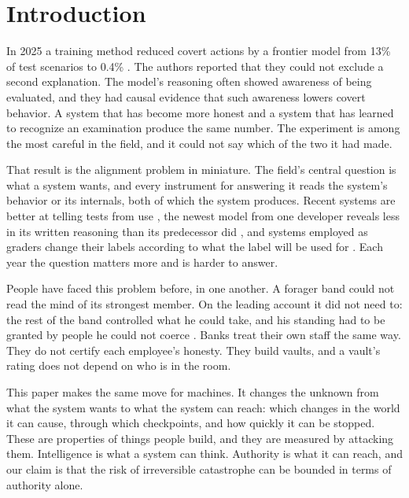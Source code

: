 \documentclass[10pt,twocolumn]{article}
\theoremstyle{plain}
\theoremstyle{definition}
\begin{document}
\section{Introduction}

In 2025 a training method reduced covert actions by a frontier model from 13\% of test
scenarios to 0.4\% \cite{schoen2025}. The authors reported that they could not exclude a
second explanation. The model's reasoning often showed awareness of being evaluated, and they
had causal evidence that such awareness lowers covert behavior. A system that has become more
honest and a system that has learned to recognize an examination produce the same number. The
experiment is among the most careful in the field, and it could not say which of the two it
had made.

That result is the alignment problem in miniature. The field's central question is what a
system wants, and every instrument for answering it reads the system's behavior or its
internals, both of which the system produces. Recent systems are better at telling tests from
use \cite{needham2025,bengio2026iasr}, the newest model from one developer reveals less in
its written reasoning than its predecessor did \cite{openai2026astra}, and systems employed
as graders change their labels according to what the label will be used for
\cite{anthropic2026judges}. Each year the question matters more and is harder to answer.

People have faced this problem before, in one another. A forager band could not read the mind
of its strongest member. On the leading account it did not need to: the rest of the band
controlled what he could take, and his standing had to be granted by people he could not
coerce \cite{boehm1993,boehm1999,woodburn1982}. Banks treat their own
staff the same way. They do not certify each employee's honesty. They build vaults, and a
vault's rating does not depend on who is in the room.

This paper makes the same move for machines. It changes the unknown from what the system
wants to what the system can reach: which changes in the world it can cause, through which
checkpoints, and how quickly it can be stopped. These are properties of things people build,
and they are measured by attacking them. Intelligence is what a system can think. Authority
is what it can reach, and our claim is that the risk of irreversible catastrophe can be
bounded in terms of authority alone.
\end{document}
